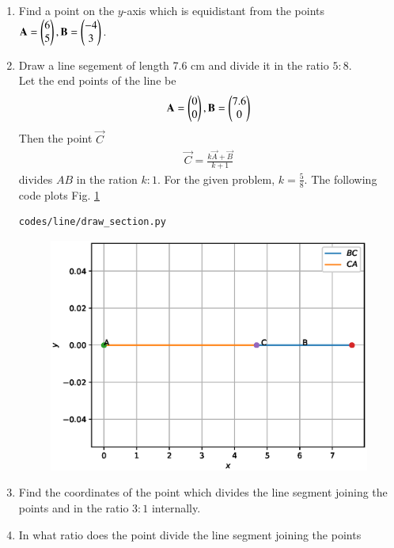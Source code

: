 \begin{enumerate}[label=\arabic*.,ref=\thesubsection.\theenumi]
\item Find a point on the $y$-axis which is equidistant from the points $\mathbf{A} = \begin{pmatrix}6\\5\end{pmatrix}, \mathbf{B} = \begin{pmatrix}-4\\3\end{pmatrix}$.
\item Draw a line segement of length 7.6 cm and divide it in the ratio $5:8$.
\\
\solution Let the end points of the line be 
\begin{align}
\mathbf{A} = \begin{pmatrix}0\\0\end{pmatrix}, \mathbf{B} = \begin{pmatrix}7.6\\0\end{pmatrix}
\end{align}
Then the point $\vec{C}$
\begin{align}
\vec{C} = \frac{k \vec{A} + \vec{B}}{k+1}
\end{align}
divides $AB$ in the ration $k:1$. For the given problem, $k = \frac{5}{8}$.
The following code plots Fig. \ref{fig:section}
\begin{lstlisting}
codes/line/draw_section.py
\end{lstlisting}
\begin{figure}[!ht]
\includegraphics[width=\columnwidth]{./line/figs/section.eps}
\caption{}
\label{fig:section}
\end{figure}
\item Find the coordinates of the point which divides the line segment joining the points  and  in the ratio $3:1$ internally.
\item In what ratio does the point  divide the line segment joining the points 

\end{enumerate}
